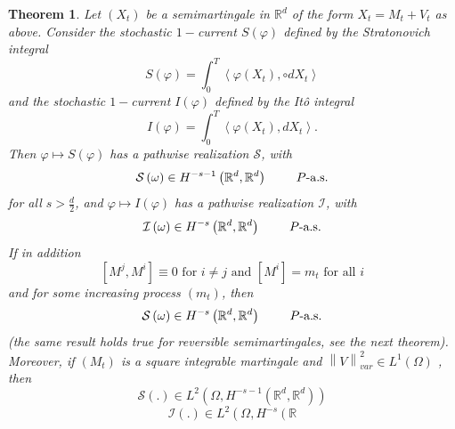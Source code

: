 \documentclass{article}
\newtheorem{theorem}{Theorem}
\begin{document}
\begin{theorem}
Let $\left( X_{t}\right) $ be a semimartingale in $\mathbb{R}^{d}$ of the
form $X_{t}=M_{t}+V_{t}$ as above. Consider the stochastic $1-$current $%
S\left( \varphi \right) $ defined by the Stratonovich integral 
\begin{equation*}
S\left( \varphi \right) =\int_{0}^{T}\left\langle \varphi \left(
X_{t}\right) ,\circ dX_{t}\right\rangle
\end{equation*}
and the stochastic $1-$current $I\left( \varphi \right) $ defined by the
It\^{o} integral 
\begin{equation*}
I\left( \varphi \right) =\int_{0}^{T}\left\langle \varphi \left(
X_{t}\right) ,dX_{t}\right\rangle .
\end{equation*}
Then $\varphi \mapsto S\left( \varphi \right) $ has a pathwise realization $%
\mathcal{S} $, with 
\begin{equation*}
\mathcal{S}\left( \omega \right) \in H^{-s-1}\left( \mathbb{R}^{d},\mathbb{R}%
^{d}\right) \text{ \qquad }P\text{-a.s.}
\end{equation*}
for all $s>\frac{d}{2}$, and $\varphi \mapsto I\left( \varphi \right) $ has
a pathwise realization $\mathcal{I} $, with 
\begin{equation*}
\mathcal{I}\left( \omega \right) \in H^{-s}\left( \mathbb{R}^{d},\mathbb{R}%
^{d}\right) \text{ \qquad }P\text{-a.s.}
\end{equation*}
If in addition 
\begin{equation}
\left[ M^{j},M^{i}\right] \equiv 0\text{ for }i\neq j\text{ and }\left[ M^{i}%
\right] =m_{t}\text{ for all }i  \label{algass}
\end{equation}
and for some increasing process $\left( m_{t}\right) $, then 
\begin{equation*}
\mathcal{S}\left( \omega \right) \in H^{-s}\left( \mathbb{R}^{d},\mathbb{R}%
^{d}\right) \text{ \qquad }P\text{-a.s.}
\end{equation*}
(the same result holds true for reversible semimartingales, see the next
theorem). Moreover, if $\left( M_{t}\right) $ is a square integrable
martingale and $\left\| V\right\| _{var}^{2}\in L^{1}\left( \Omega \right) $%
, then 
\begin{equation*}
\mathcal{S}\left( .\right) \in L^{2}\left( \Omega ,H^{-s-1}\left( \mathbb{R}%
^{d},\mathbb{R}^{d}\right) \right)
\end{equation*}
\begin{equation*}
\mathcal{I}\left( .\right) \in L^{2}\left( \Omega ,H^{-s}\left( \mathbb{R}%

\end{equation*}
\end{theorem}
\end{document}
